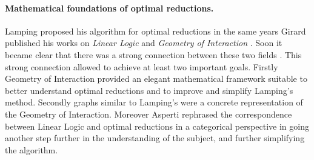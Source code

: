 \documentclass[english]{scrartcl}
\begin{document}
\paragraph{Mathematical foundations of optimal reductions.}Lamping proposed his algorithm for optimal reductions in the same years Girard published his works on \emph{Linear Logic} \cite{girard_linear_1987} and \emph{Geometry of Interaction} \cite{girard_geometry_1989}. Soon it became clear that there was a strong connection between these two fields \cite{gonthier_geometry_1992,gonthier_linear_1992}. This strong connection allowed to achieve at least two important goals. Firstly Geometry of Interaction provided an elegant mathematical framework suitable to better understand optimal reductions and to improve and simplify Lamping's method. Secondly graphs similar to Lamping's were a concrete representation of the Geometry of Interaction. Moreover Asperti rephrased the correspondence between Linear Logic and optimal reductions in a categorical perspective in \cite{asperti_linear_1995} going another step further in the understanding of the subject, and further simplifying the algorithm.
\end{document}
